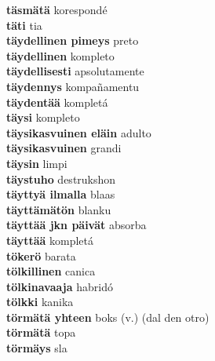 \textbf{ täsmätä  } korespondé \\
\textbf{ täti  } tia \\
\textbf{ täydellinen pimeys  } preto \\
\textbf{ täydellinen  } kompleto \\
\textbf{ täydellisesti  } apsolutamente \\
\textbf{ täydennys  } kompañamentu \\
\textbf{ täydentää  } kompletá \\
\textbf{ täysi  } kompleto \\
\textbf{ täysikasvuinen eläin  } adulto \\
\textbf{ täysikasvuinen  } grandi \\
\textbf{ täysin  } limpi \\
\textbf{ täystuho  } destrukshon \\
\textbf{ täyttyä ilmalla  } blaas \\
\textbf{ täyttämätön  } blanku \\
\textbf{ täyttää jkn päivät  } absorba \\
\textbf{ täyttää  } kompletá \\
\textbf{ tökerö  } barata \\
\textbf{ tölkillinen  } canica \\
\textbf{ tölkinavaaja  } habridó \\
\textbf{ tölkki  } kanika \\
\textbf{ törmätä yhteen  } boks (v.) (dal den otro) \\
\textbf{ törmätä  } topa \\
\textbf{ törmäys  } sla \\
